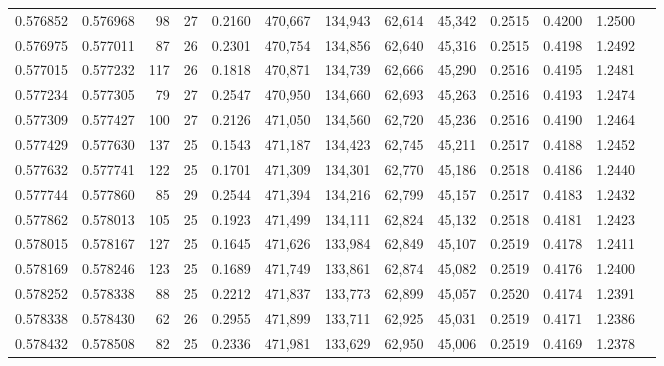 \begin{tabular}{rrrrrrrrrrrrr}
0.576852 & 0.576968 &  98 &  27 &                                     0.2160 & 470,667 & 134,943 &  62,614 &  45,342 & 0.2515 & 0.4200 & 1.2500 \\
0.576975 & 0.577011 &  87 &  26 &                                     0.2301 & 470,754 & 134,856 &  62,640 &  45,316 & 0.2515 & 0.4198 & 1.2492 \\
0.577015 & 0.577232 & 117 &  26 &                                     0.1818 & 470,871 & 134,739 &  62,666 &  45,290 & 0.2516 & 0.4195 & 1.2481 \\
0.577234 & 0.577305 &  79 &  27 &                                     0.2547 & 470,950 & 134,660 &  62,693 &  45,263 & 0.2516 & 0.4193 & 1.2474 \\
0.577309 & 0.577427 & 100 &  27 &                                     0.2126 & 471,050 & 134,560 &  62,720 &  45,236 & 0.2516 & 0.4190 & 1.2464 \\
0.577429 & 0.577630 & 137 &  25 &                                     0.1543 & 471,187 & 134,423 &  62,745 &  45,211 & 0.2517 & 0.4188 & 1.2452 \\
0.577632 & 0.577741 & 122 &  25 &                                     0.1701 & 471,309 & 134,301 &  62,770 &  45,186 & 0.2518 & 0.4186 & 1.2440 \\
0.577744 & 0.577860 &  85 &  29 &                                     0.2544 & 471,394 & 134,216 &  62,799 &  45,157 & 0.2517 & 0.4183 & 1.2432 \\
0.577862 & 0.578013 & 105 &  25 &                                     0.1923 & 471,499 & 134,111 &  62,824 &  45,132 & 0.2518 & 0.4181 & 1.2423 \\
0.578015 & 0.578167 & 127 &  25 &                                     0.1645 & 471,626 & 133,984 &  62,849 &  45,107 & 0.2519 & 0.4178 & 1.2411 \\
0.578169 & 0.578246 & 123 &  25 &                                     0.1689 & 471,749 & 133,861 &  62,874 &  45,082 & 0.2519 & 0.4176 & 1.2400 \\
0.578252 & 0.578338 &  88 &  25 &                                     0.2212 & 471,837 & 133,773 &  62,899 &  45,057 & 0.2520 & 0.4174 & 1.2391 \\
0.578338 & 0.578430 &  62 &  26 &                                     0.2955 & 471,899 & 133,711 &  62,925 &  45,031 & 0.2519 & 0.4171 & 1.2386 \\
0.578432 & 0.578508 &  82 &  25 &                                     0.2336 & 471,981 & 133,629 &  62,950 &  45,006 & 0.2519 & 0.4169 & 1.2378 \\

\end{tabular}
